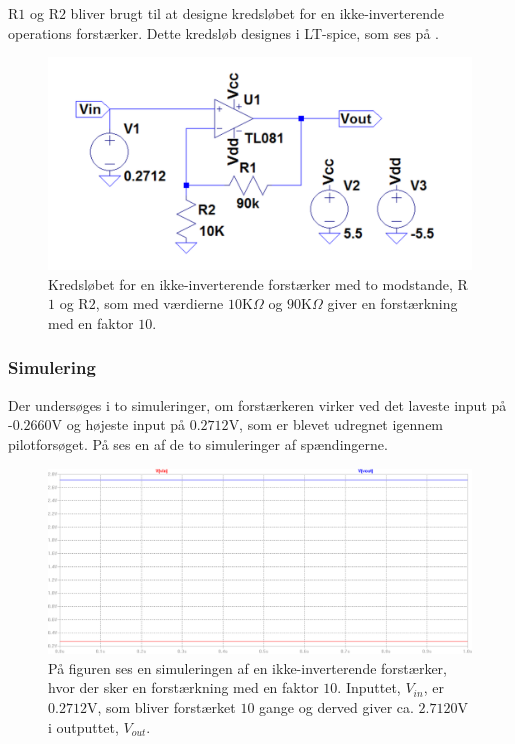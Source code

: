 \noindent R$1$ og R$2$ bliver brugt til at designe kredsløbet for en ikke-inverterende operations forstærker. Dette kredsløb designes i LT-spice, som ses på . 
\begin{figure}[H]
\centering
\includegraphics[scale=0.5]{figures/cProblemloesning/Forstaerker_faktor18.PNG}
\caption{Kredsløbet for en ikke-inverterende forstærker med to modstande, R$1$ og R$2$, som med værdierne $10$K$\Omega$ og $90$K$\Omega$ giver en forstærkning med en faktor $10$.}
\label{fig:Forstaerker_faktor18}
\end{figure} 

\subsubsection{Simulering}\label{Subsec:Forstaerker_simu}
Der undersøges i to simuleringer, om forstærkeren virker ved det laveste input på -$0.2660$V og højeste input på $0.2712$V, som er blevet udregnet igennem pilotforsøget. På  ses en af de to simuleringer af spændingerne.

\begin{figure}[H]
\centering
\includegraphics[scale=0.4]{figures/cProblemloesning/Forstaerker_faktor18_simulering.PNG}
\caption{På figuren ses en simuleringen af en ikke-inverterende forstærker, hvor der sker en forstærkning med en faktor $10$. Inputtet, $V_{in}$, er $0.2712$V, som bliver forstærket $10$ gange og derved giver ca. $2.7120$V i outputtet, $V_{out}$.}
\label{fig:Forstaerker_faktor18_simulering}
\end{figure}

